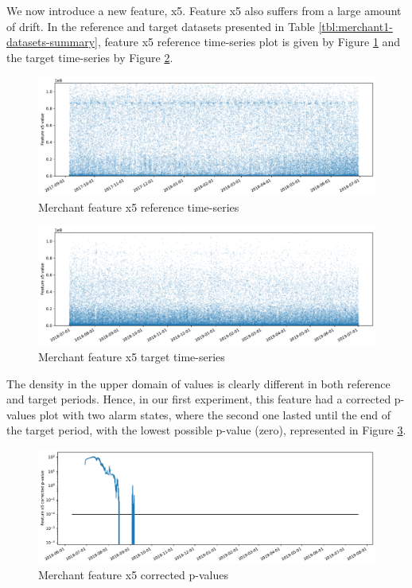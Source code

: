 We now introduce a new feature, x5. Feature x5 also suffers from a large amount of drift. In the reference and target datasets presented in Table \ref{tbl:merchant1-datasets-summary}, feature x5 reference time-series plot is given by Figure \ref{fig:merchant-x5-reference} and the target time-series by Figure \ref{fig:merchant-x5-target}.
\begin{figure}[!htb]
    \begin{center}
      \includegraphics[scale=0.5]{figures/merchant-x5-reference.pdf}
      \caption{Merchant feature x5 reference time-series}
      \label{fig:merchant-x5-reference}
    \end{center}
\end{figure}
\begin{figure}[!htb]
    \begin{center}
      \includegraphics[scale=0.5]{figures/merchant-x5-target.pdf}
      \caption{Merchant feature x5 target time-series}
      \label{fig:merchant-x5-target}
    \end{center}
\end{figure}
The density in the upper domain of values is clearly different in both reference and target periods. Hence, in our first experiment, this feature had a corrected p-values plot with two alarm states, where the second one lasted until the end of the target period, with the lowest possible p-value (zero), represented in Figure \ref{fig:merchant-x5-correctedpvalues}.
\begin{figure}[!htb]
    \begin{center}
      \includegraphics[scale=0.5]{figures/merchant-x5-correctedpvalues.pdf}
      \caption{Merchant feature x5 corrected p-values}
      \label{fig:merchant-x5-correctedpvalues}
    \end{center}
\end{figure}

